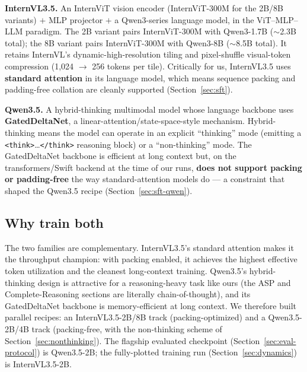 \documentclass[11pt,a4paper]{article}
\begin{document}
\textbf{InternVL3.5.} An InternViT vision encoder (InternViT-300M for the 2B/8B variants) $+$ MLP projector $+$ a Qwen3-series language model, in the ViT--MLP--LLM paradigm. The 2B variant pairs InternViT-300M with Qwen3-1.7B ($\sim$2.3B total); the 8B variant pairs InternViT-300M with Qwen3-8B ($\sim$8.5B total). It retains InternVL's dynamic-high-resolution tiling and pixel-shuffle visual-token compression (1{,}024 $\rightarrow$ 256 tokens per tile). Critically for us, InternVL3.5 uses \textbf{standard attention} in its language model, which means sequence packing and padding-free collation are cleanly supported (Section~\ref{sec:sft}).

\textbf{Qwen3.5.} A hybrid-thinking multimodal model whose language backbone uses \textbf{GatedDeltaNet}, a linear-attention/state-space-style mechanism. Hybrid-thinking means the model can operate in an explicit ``thinking'' mode (emitting a \texttt{<think>}\dots\texttt{</think>} reasoning block) or a ``non-thinking'' mode. The GatedDeltaNet backbone is efficient at long context but, on the transformers/Swift backend at the time of our runs, \textbf{does not support packing or padding-free} the way standard-attention models do --- a constraint that shaped the Qwen3.5 recipe (Section~\ref{sec:sft-qwen}).

\subsection{Why train both}
The two families are complementary. InternVL3.5's standard attention makes it the throughput champion: with packing enabled, it achieves the highest effective token utilization and the cleanest long-context training. Qwen3.5's hybrid-thinking design is attractive for a reasoning-heavy task like ours (the ASP and Complete-Reasoning sections are literally chain-of-thought), and its GatedDeltaNet backbone is memory-efficient at long context. We therefore built parallel recipes: an InternVL3.5-2B/8B track (packing-optimized) and a Qwen3.5-2B/4B track (packing-free, with the non-thinking scheme of Section~\ref{sec:nonthinking}). The flagship evaluated checkpoint (Section~\ref{sec:eval-protocol}) is Qwen3.5-2B; the fully-plotted training run (Section~\ref{sec:dynamics}) is InternVL3.5-2B.
\end{document}
